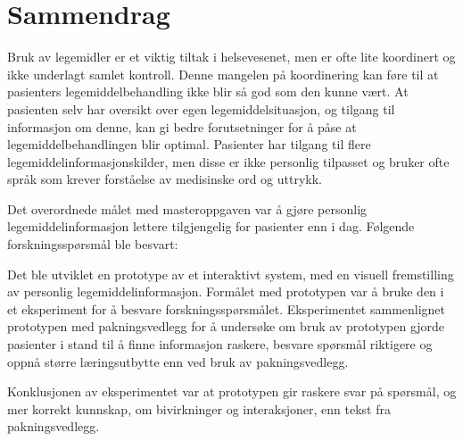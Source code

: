 \chapter*{Sammendrag}
\setcounter{page}{1}

Bruk av legemidler er et viktig tiltak i helsevesenet, men er ofte lite koordinert og ikke underlagt samlet kontroll. Denne mangelen på koordinering kan føre til at pasienters legemiddelbehandling ikke blir så god som den kunne vært. At pasienten selv har oversikt over egen legemiddelsituasjon, og tilgang til informasjon om denne, kan gi bedre forutsetninger for å påse at legemiddelbehandlingen blir optimal. Pasienter har tilgang til flere legemiddelinformasjonskilder, men disse er ikke personlig tilpasset og bruker ofte språk som krever forståelse av medisinske ord og uttrykk. 

Det overordnede målet med masteroppgaven var å gjøre personlig legemiddelinformasjon lettere tilgjengelig for pasienter enn i dag. Følgende forskningsspørsmål ble besvart: 
\thesisRQ

Det ble utviklet en prototype av et interaktivt system, med en visuell fremstilling av personlig legemiddelinformasjon. Formålet med prototypen var å bruke den i et eksperiment for å besvare forskningsspørsmålet. Eksperimentet sammenlignet  prototypen med pakningsvedlegg for å undersøke om bruk av prototypen gjorde pasienter i stand til å finne informasjon raskere, besvare spørsmål riktigere og oppnå større læringsutbytte enn ved bruk av pakningsvedlegg. 

Konklusjonen av eksperimentet var at prototypen gir raskere svar på spørsmål, og mer korrekt kunnskap, om bivirkninger og interaksjoner, enn tekst fra pakningsvedlegg.